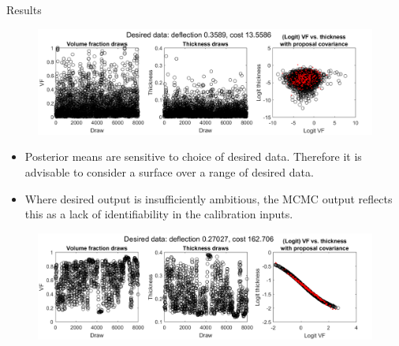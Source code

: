 \documentclass[final]{beamer}
\newlength{\onecolwid}
\begin{document}
\begin{frame}[t]
\begin{columns}[t]
\begin{column}{\onecolwid}

\begin{alertblock}{Results}


\begin{figure}[h!]
\includegraphics[width=\linewidth]{FIG1}
\label{res}
\end{figure}

\vspace{-24mm}
\begin{itemize}
\item Posterior means are sensitive to choice of desired data. Therefore it is advisable to consider a surface over a range of desired data.
\item Where desired output is insufficiently ambitious, the MCMC output reflects this as a lack of identifiability in the calibration inputs.
\end{itemize}

\vspace{-4mm}
\begin{figure}[h!]
\includegraphics[width=\linewidth]{FIG2}
\label{unident}
\end{figure}

\vspace{-20mm}
\end{alertblock}



\end{column}
\end{columns}
\end{frame}
\end{document}
